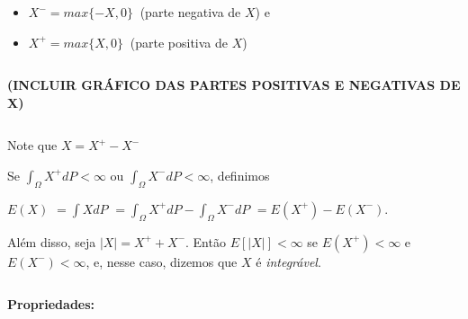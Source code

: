 \documentclass[
]{book}
\begin{document}
\begin{itemize}
\item
  \(X^- = max\{-X,0\}~\) (parte negativa de \(X\)) e
\item
  \(X^+ = max\{X,0\}~\) (parte positiva de \(X\))
\end{itemize}

\(~\)

\textbf{(INCLUIR GRÁFICO DAS PARTES POSITIVAS E NEGATIVAS DE X)}

\(~\)

Note que \(X = X^+ - X^-\)

Se \(\int_\Omega X^+ dP < \infty\) ou \(\int_\Omega X^- dP < \infty\), definimos

\(E(X)\) \(=\int X dP\) \(= \int_\Omega X^+dP - \int_\Omega X^- dP\) \(=E(X^+) - E(X^-)\).

Além disso, seja \(|X| = X^+ + X^-\). Então \(E[|X|] < \infty\) se \(E(X^+) < \infty\) e \(E(X^-) < \infty\), e, nesse caso, dizemos que \(X\) é \emph{integrável}.

\(~\)

\textbf{Propriedades:}
\end{document}
